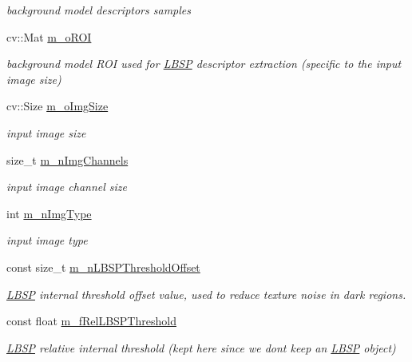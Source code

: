 \begin{DoxyCompactItemize}
\begin{DoxyCompactList}\small\item\em background model descriptors samples \end{DoxyCompactList}\item 
cv\+::\+Mat \mbox{\hyperlink{class_background_subtractor_l_b_s_p_a53fe98bd2489d95de5292467145901e9}{m\+\_\+o\+R\+OI}}
\begin{DoxyCompactList}\small\item\em background model R\+OI used for \mbox{\hyperlink{class_l_b_s_p}{L\+B\+SP}} descriptor extraction (specific to the input image size) \end{DoxyCompactList}\item 
cv\+::\+Size \mbox{\hyperlink{class_background_subtractor_l_b_s_p_a732d5e6ae35fb0e858cadb3af5ce08a2}{m\+\_\+o\+Img\+Size}}
\begin{DoxyCompactList}\small\item\em input image size \end{DoxyCompactList}\item 
size\+\_\+t \mbox{\hyperlink{class_background_subtractor_l_b_s_p_ab3467ebee2c5d1249061ccd704cc0584}{m\+\_\+n\+Img\+Channels}}
\begin{DoxyCompactList}\small\item\em input image channel size \end{DoxyCompactList}\item 
int \mbox{\hyperlink{class_background_subtractor_l_b_s_p_a7d2f52ecd5ff56e42da86f97e0ad93b5}{m\+\_\+n\+Img\+Type}}
\begin{DoxyCompactList}\small\item\em input image type \end{DoxyCompactList}\item 
const size\+\_\+t \mbox{\hyperlink{class_background_subtractor_l_b_s_p_a209eb6aaa34e8ad8e565e79f85404e24}{m\+\_\+n\+L\+B\+S\+P\+Threshold\+Offset}}
\begin{DoxyCompactList}\small\item\em \mbox{\hyperlink{class_l_b_s_p}{L\+B\+SP}} internal threshold offset value, used to reduce texture noise in dark regions. \end{DoxyCompactList}\item 
const float \mbox{\hyperlink{class_background_subtractor_l_b_s_p_ad759c645b14e9b16bf3940cae862df32}{m\+\_\+f\+Rel\+L\+B\+S\+P\+Threshold}}
\begin{DoxyCompactList}\small\item\em \mbox{\hyperlink{class_l_b_s_p}{L\+B\+SP}} relative internal threshold (kept here since we don\textquotesingle{}t keep an \mbox{\hyperlink{class_l_b_s_p}{L\+B\+SP}} object) \end{DoxyCompactList}\item 

\end{DoxyCompactItemize}
